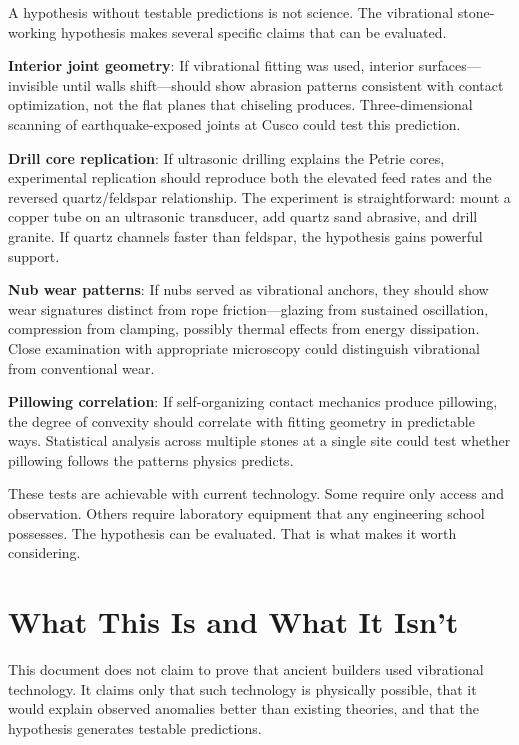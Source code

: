 \documentclass[11pt]{article}
\begin{document}
A hypothesis without testable predictions is not science. The vibrational stone-working hypothesis makes several specific claims that can be evaluated.

\textbf{Interior joint geometry}: If vibrational fitting was used, interior surfaces---invisible until walls shift---should show abrasion patterns consistent with contact optimization, not the flat planes that chiseling produces. Three-dimensional scanning of earthquake-exposed joints at Cusco could test this prediction.

\textbf{Drill core replication}: If ultrasonic drilling explains the Petrie cores, experimental replication should reproduce both the elevated feed rates and the reversed quartz/feldspar relationship. The experiment is straightforward: mount a copper tube on an ultrasonic transducer, add quartz sand abrasive, and drill granite. If quartz channels faster than feldspar, the hypothesis gains powerful support.

\textbf{Nub wear patterns}: If nubs served as vibrational anchors, they should show wear signatures distinct from rope friction---glazing from sustained oscillation, compression from clamping, possibly thermal effects from energy dissipation. Close examination with appropriate microscopy could distinguish vibrational from conventional wear.

\textbf{Pillowing correlation}: If self-organizing contact mechanics produce pillowing, the degree of convexity should correlate with fitting geometry in predictable ways. Statistical analysis across multiple stones at a single site could test whether pillowing follows the patterns physics predicts.

These tests are achievable with current technology. Some require only access and observation. Others require laboratory equipment that any engineering school possesses. The hypothesis can be evaluated. That is what makes it worth considering.

\section{What This Is and What It Isn't}

This document does not claim to prove that ancient builders used vibrational technology. It claims only that such technology is physically possible, that it would explain observed anomalies better than existing theories, and that the hypothesis generates testable predictions.
\end{document}
